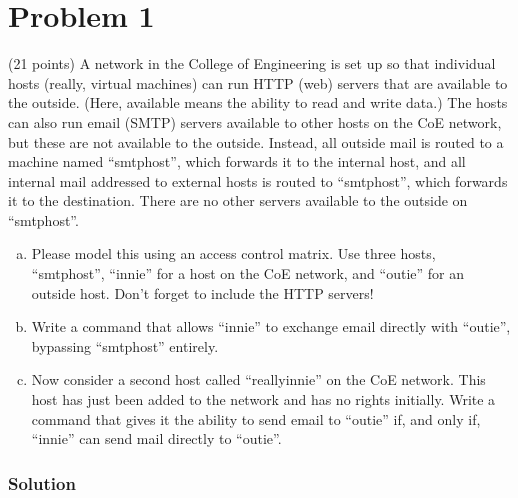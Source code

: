 
\section*{Problem 1}
 (21 points) A network in the College of Engineering is set up so that individual hosts (really, virtual machines) can run HTTP (web) servers that are available to the outside.
(Here, available means the ability to read and write data.)
The hosts can also run email (SMTP) servers available to other hosts on the CoE network, but these are not available to the outside. Instead, all outside mail is routed to a machine named ``smtphost'', which forwards it to the internal host, and all internal mail addressed to external hosts is routed to ``smtphost'', which forwards it to the destination. There are no other servers available to the outside on ``smtphost''.

\begin{enumerate}[(a)]
    \item Please model this using an access control matrix. Use three hosts, ``smtphost'', ``innie'' for a host on the CoE network, and ``outie'' for an outside host. Don’t forget to include the HTTP servers!
    \item Write a command that allows ``innie'' to exchange email directly with ``outie'', bypassing ``smtphost'' entirely.
    \item Now consider a second host called ``reallyinnie'' on the CoE network. This host has just been added to the network and has no rights initially. Write a command that gives it the ability to send email to ``outie'' if, and only if, ``innie'' can send mail directly to ``outie''.
\end{enumerate}

\subsubsection*{Solution}

